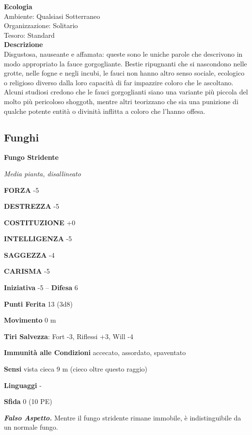 \begin{multicols}{2}
\textbf{Ecologia}\\
Ambiente: Qualsiasi Sotterraneo\\
Organizzazione: Solitario\\
Tesoro: Standard\\
\textbf{Descrizione}\\
Disgustosa, nauseante e affamata: queste sono le uniche parole che descrivono in modo appropriato la fauce gorgogliante. Bestie ripugnanti che si nascondono nelle grotte, nelle fogne e negli incubi, le fauci non hanno altro senso sociale, ecologico o religioso diverso dalla loro capacità di far impazzire coloro che le ascoltano. Alcuni studiosi credono che le fauci gorgoglianti siano una variante più piccola del molto più pericoloso shoggoth, mentre altri teorizzano che sia una punizione di qualche potente entità o divinità inflitta a coloro che l'hanno offesa.\\




\subsection{Funghi}

\medskip{}\textbf{Fungo Stridente}

\emph{Media pianta, disallineato}

\textbf{FORZA} -5

\textbf{DESTREZZA} -5

\textbf{COSTITUZIONE} +0

\textbf{INTELLIGENZA} -5

\textbf{SAGGEZZA} -4

\textbf{CARISMA} -5

\textbf{Iniziativa} -5 -- \textbf{Difesa} 6

\textbf{Punti Ferita} 13 (3d8)

\textbf{Movimento} 0 m

\textbf{Tiri Salvezza}: Fort -3, Riflessi +3, Will -4

\textbf{Immunità alle Condizioni} accecato, assordato, spaventato

\textbf{Sensi} vista cieca 9 m (cieco oltre questo raggio)

\textbf{Linguaggi} -

\textbf{Sfida} 0 (10 PE)

\emph{\textbf{Falso Aspetto.}} Mentre il fungo stridente rimane immobile, è indistinguibile da un normale fungo.


\end{multicols}

